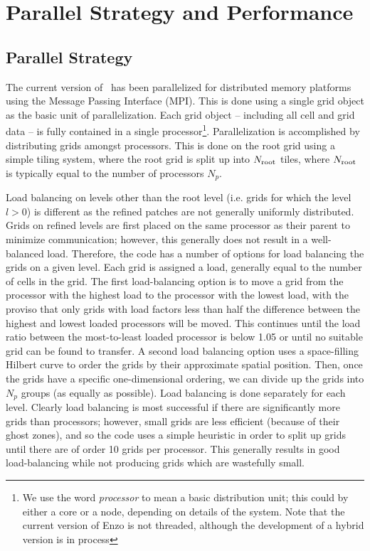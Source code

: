 \section{Parallel Strategy and Performance}
\label{sec.parallel}

\subsection{Parallel Strategy}

The current version of \enzo\ has been parallelized for distributed memory platforms using the Message Passing Interface (MPI).  This is done using a single grid object as the basic unit of parallelization.  Each grid object -- including all cell and grid data -- is fully contained in a single processor\footnote{We use the word {\it processor} to mean a basic distribution unit; this could by either a core or a node, depending on details of the system.  Note that the current version of Enzo is not threaded, although the development of a hybrid version is in process}.  Parallelization is accomplished by distributing grids amongst processors.  This is done on the root grid using a simple tiling system, where the root grid is split up into $N_{\rm root}$ tiles, where $N_{\rm root}$ is typically equal to the number of processors $N_p$.  

Load balancing on levels other than the root level (i.e. grids for which the level $l > 0$) is different as the refined patches are not generally uniformly distributed.   Grids on refined levels are first placed on the same processor as their parent to minimize communication; however, this generally does not result in a well-balanced load.  Therefore, the code has a number of options for load balancing the grids on a given level. Each grid is assigned a load, generally equal to the number of cells in the grid.  The first load-balancing option is to move a grid from the processor with the highest load to the processor with the lowest load, with the proviso that only grids with load factors less than half the difference between the highest and lowest loaded processors will be moved.  This continues until the load ratio between the most-to-least loaded processor is below 1.05 or until no suitable grid can be found to transfer.  A second load balancing option uses a space-filling Hilbert curve to order the grids by their approximate spatial position.  Then, once the grids have a specific one-dimensional ordering, we can divide up the grids into $N_p$ groups (as equally as possible).  Load balancing is done separately for each level.  Clearly load balancing is most successful if there are significantly more grids than processors; however, small grids are less efficient (because of their ghost zones), and so the code uses a simple heuristic in order to split up grids until there are of order 10 grids per processor.  This generally results in good load-balancing while not producing grids which are wastefully small.

